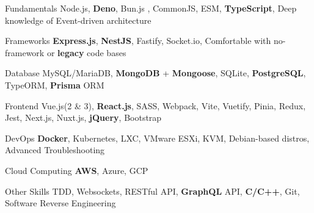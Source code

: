 
\begin{cvskills}

  \cvskill
    {Fundamentals}
    {Node.js, \textbf{Deno}, Bun.js , CommonJS, ESM, \textbf{TypeScript}, Deep knowledge of Event-driven architecture}

  \cvskill
    {Frameworks}
    {\textbf{Express.js}, \textbf{NestJS}, Fastify, Socket.io, Comfortable with no-framework or \textbf{legacy} code bases}
  
  \cvskill
    {Database}
    {MySQL/MariaDB, \textbf{MongoDB} + \textbf{Mongoose}, SQLite, \textbf{PostgreSQL}, TypeORM, \textbf{Prisma} ORM}

  \cvskill
    {Frontend} %
    {Vue.js(2 \& 3), \textbf{React.js}, SASS, Webpack, Vite, Vuetify, Pinia, Redux, Jest, Next.js, Nuxt.js, \textbf{jQuery}, Bootstrap} %

  \cvskill
    {DevOps} %
    {\textbf{Docker}, Kubernetes, LXC, VMware ESXi, KVM, Debian-based distros, Advanced Troubleshooting} %
    
  \cvskill
    {Cloud Computing} %
    {\textbf{AWS}, Azure, GCP} %

  \cvskill
    {Other Skills} %
    {TDD, Websockets, RESTful API, \textbf{GraphQL} API, \textbf{C/C++}, Git, Software Reverse Engineering} %

\end{cvskills}
